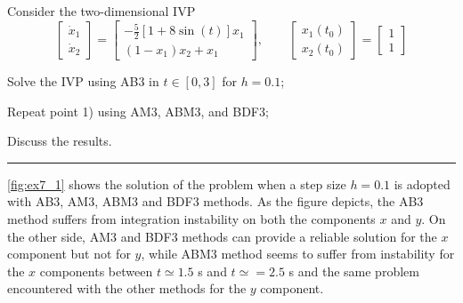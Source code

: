 \documentclass[11pt,a4paper,oneside]{article}
\begin{document}
Consider the two-dimensional IVP 
\[\begin{bmatrix}\dot{x}_1 \\ \dot{x}_2\end{bmatrix}=\begin{bmatrix}-\frac{5}{2}\left[1+8\sin(t)\right]x_1 \\ (1-x_1)x_2+x_1\end{bmatrix}, \qquad \begin{bmatrix} x_1(t_0)\\ x_2(t_0)\end{bmatrix}=\begin{bmatrix} 1\\ 1\end{bmatrix}\]
\begin{enumerate*}[label=\arabic*)]
    \item Solve the IVP using AB3 in $t\in[0,3]$ for $h=0.1$;
    \item Repeat point 1) using AM3, ABM3, and BDF3;
    \item Discuss the results.
\end{enumerate*}

\medskip \hrule \medskip


\autoref{fig:ex7_1} shows the solution of the problem when a step size $h=0.1$ is adopted with AB3, AM3, ABM3 and BDF3 methods. As the figure depicts, the AB3 method suffers from integration instability on both the components $x$ and $y$. On the other side, AM3 and BDF3 methods can provide a reliable solution for the $x$ component but not for $y$, while ABM3 method seems to suffer from instability for the $x$ components between $t\simeq1.5$ s and $t\simeq=2.5$ s and the same problem encountered with the other methods for the $y$ component.
\end{document}
